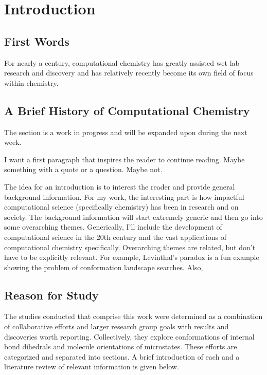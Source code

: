 \chapter{Introduction}
\label{ch:Introduction}

\section{First Words}

For nearly a century, computational chemistry has greatly assisted wet lab research and discovery and has relatively recently become its own field of focus within chemistry.


\section{A Brief History of Computational Chemistry}

The section is a work in progress and will be expanded upon during the next week.













I want a first paragraph that inspires the reader to continue reading. Maybe something with a quote or a question. Maybe not.

The idea for an introduction is to interest the reader and provide general background information. 
For my work, the interesting part is how impactful computational science (specifically chemistry) has been in research and on society. 
The background information will start extremely generic and then go into some overarching themes. 
Generically, I'll include the development of computational science in the 20th century and the vast applications of computational chemistry specifically. 
Overarching themes are related, but don't have to be explicitly relevant. 
For example, Levinthal's paradox is a fun example showing the problem of conformation landscape searches.
Also, 

\section{Reason for Study}

The studies conducted that comprise this work were determined as a combination of collaborative efforts and larger research group goals with results and discoveries worth reporting.
Collectively, they explore conformations of internal bond dihedrals and molecule orientations of microstates.
These efforts are categorized and separated into sections.
A brief introduction of each and a literature review of relevant information is given below.

